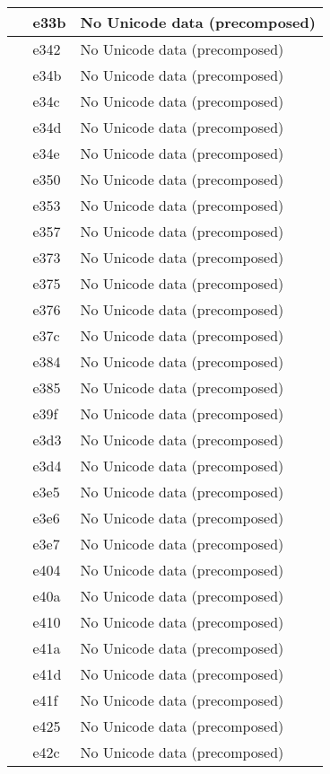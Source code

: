\documentclass[12pt,letterpaper,openany]{book}
\begin{document}
\begin{center}
\begin{supertabular}{|m{0.25in}|m{0.5in}|m{4in}|}
			 & e33b & No Unicode data (precomposed)\\\hline
			 & e342 & No Unicode data (precomposed)\\\hline
			 & e34b & No Unicode data (precomposed)\\\hline
			 & e34c & No Unicode data (precomposed)\\\hline
			 & e34d & No Unicode data (precomposed)\\\hline
			 & e34e & No Unicode data (precomposed)\\\hline
			 & e350 & No Unicode data (precomposed)\\\hline
			 & e353 & No Unicode data (precomposed)\\\hline
			 & e357 & No Unicode data (precomposed)\\\hline
			 & e373 & No Unicode data (precomposed)\\\hline
			 & e375 & No Unicode data (precomposed)\\\hline
			 & e376 & No Unicode data (precomposed)\\\hline
			 & e37c & No Unicode data (precomposed)\\\hline
			 & e384 & No Unicode data (precomposed)\\\hline
			 & e385 & No Unicode data (precomposed)\\\hline
			 & e39f & No Unicode data (precomposed)\\\hline
			 & e3d3 & No Unicode data (precomposed)\\\hline
			 & e3d4 & No Unicode data (precomposed)\\\hline
			 & e3e5 & No Unicode data (precomposed)\\\hline
			 & e3e6 & No Unicode data (precomposed)\\\hline
			 & e3e7 & No Unicode data (precomposed)\\\hline
			 & e404 & No Unicode data (precomposed)\\\hline
			 & e40a & No Unicode data (precomposed)\\\hline
			 & e410 & No Unicode data (precomposed)\\\hline
			 & e41a & No Unicode data (precomposed)\\\hline
			 & e41d & No Unicode data (precomposed)\\\hline
			 & e41f & No Unicode data (precomposed)\\\hline
			 & e425 & No Unicode data (precomposed)\\\hline
			 & e42c & No Unicode data (precomposed)\\\hline

\end{supertabular}
\end{center}
\end{document}
